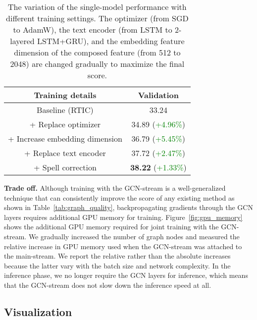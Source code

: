 \documentclass[10pt,twocolumn,letterpaper]{article}
\begin{document}
    \begin{table}[h]
        \caption{The variation of the single-model performance with different training settings. The optimizer (from SGD to AdamW), the text encoder (from LSTM to 2-layered LSTM+GRU), and the embedding feature dimension of the composed feature (from 512 to 2048) are changed gradually to maximize the final score.}
        \centering
        \begin{adjustbox}{width=0.41\textwidth}
        \begin{tabular}{cc}
        \toprule
        Training details & Validation \\
        \hline \hline
        Baseline (RTIC) & 33.24 \\
        \hline
        + Replace optimizer & 34.89 (\textcolor{green}{+4.96\%}) \\
        + Increase embedding dimension & 36.79 (\textcolor{green}{+5.45\%}) \\
        + Replace text encoder & 37.72 (\textcolor{green}{+2.47\%}) \\
        + Spell correction & \textbf{38.22} (\textcolor{green}{+1.33\%}) \\
        \bottomrule
        \end{tabular}
        \end{adjustbox}
        \label{tab:ablation_study}
    \end{table}
    
\noindent
\textbf{Trade off.} Although training with the GCN-stream is a well-generalized technique that can consistently improve the score of any existing method as shown in Table~\ref{tab:graph_quality}, backpropagating gradients through the GCN layers requires additional GPU memory for training. Figure~\ref{fig:gpu_memory} shows the additional GPU memory required for joint training with the GCN-stream. We gradually increased the number of graph nodes and measured the relative increase in GPU memory used when the GCN-stream was attached to the main-stream. We report the relative rather than the absolute increases because the latter vary with the batch size and network complexity. In the inference phase, we no longer require the GCN layers for inference, which means that the GCN-stream does not slow down the inference speed at all.

\subsection{Visualization}
\end{document}
